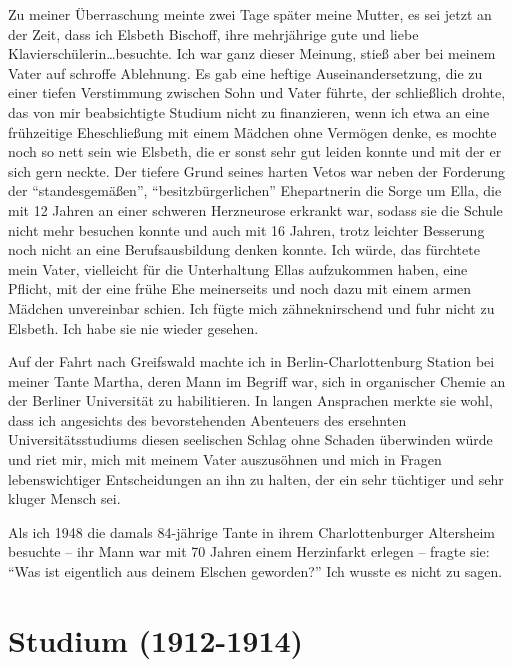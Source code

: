 \documentclass[a5paper,pagesize,10pt,twoside=true]{scrbook}
\begin{document}
Zu meiner Überraschung meinte zwei Tage später meine Mutter, es sei jetzt an der Zeit, dass ich Elsbeth Bischoff, ihre mehrjährige gute und liebe Klavierschülerin\dots besuchte. Ich war ganz dieser Meinung, stieß aber bei meinem Vater auf schroffe Ablehnung. Es gab eine heftige Auseinandersetzung, die zu einer tiefen Verstimmung zwischen Sohn und Vater führte, der schließlich drohte, das von mir beabsichtigte Studium nicht zu finanzieren, wenn ich etwa an eine frühzeitige Eheschließung mit einem Mädchen ohne Vermögen denke, es mochte noch so nett sein wie Elsbeth, die er sonst sehr gut leiden konnte und mit der er sich gern neckte. Der tiefere Grund seines harten Vetos war neben der Forderung der \enquote{standesgemäßen}, \enquote{besitzbürgerlichen} Ehepartnerin die Sorge um Ella, die mit 12 Jahren an einer schweren Herzneurose erkrankt war, sodass sie die Schule nicht mehr besuchen konnte und auch mit 16 Jahren, trotz leichter Besserung noch nicht an eine Berufsausbildung denken konnte. Ich würde, das fürchtete mein Vater, vielleicht für die Unterhaltung Ellas aufzukommen haben, eine Pflicht, mit der eine frühe Ehe meinerseits und noch dazu mit einem armen Mädchen unvereinbar schien. Ich fügte mich zähneknirschend und fuhr nicht zu Elsbeth. Ich habe sie nie wieder gesehen.

Auf der Fahrt nach Greifswald machte ich in Berlin-Charlottenburg Station bei meiner Tante Martha, deren Mann im Begriff war, sich in organischer Chemie an der Berliner Universität zu habilitieren. In langen Ansprachen merkte sie wohl, dass ich angesichts des bevorstehenden Abenteuers des ersehnten Universitätsstudiums diesen seelischen Schlag ohne Schaden überwinden würde und riet mir, mich mit meinem Vater auszusöhnen und mich in Fragen lebenswichtiger Entscheidungen an ihn zu halten, der ein sehr tüchtiger und sehr kluger Mensch sei.

Als ich 1948 die damals 84-jährige Tante in ihrem Charlottenburger Altersheim besuchte -- ihr Mann war mit 70 Jahren einem Herzinfarkt erlegen -- fragte sie: \enquote{Was ist eigentlich aus deinem Elschen geworden?} Ich wusste es nicht zu sagen.


\chapter{Studium (1912-1914)}
\end{document}

